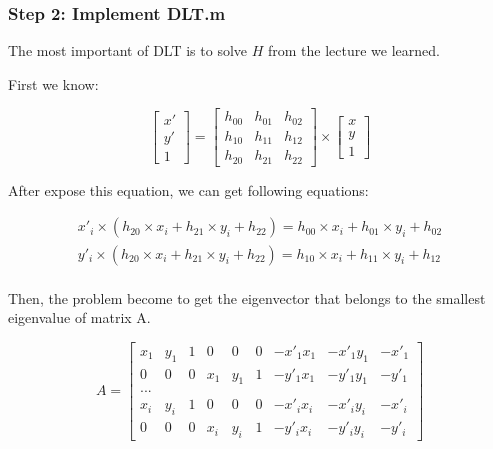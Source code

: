 \documentclass{article}
\begin{document}
\subsubsection*{Step 2: Implement DLT.m}

The most important of DLT is to solve $H$ from the lecture we learned. 

First we know:

$$\begin{bmatrix}
x' \\ y' \\ 1 \end{bmatrix} = \left[ \begin{array}{ccc} h_{00} & h_{01} & h_{02} \\ h_{10} & h_{11} & h_{12} \\ h_{20} & h_{21} & h_{22} \end{array} \right] \times \left[ \begin{array}{c} x \\ y \\ 1 \end{array} \right]$$


After expose this equation, we can get following equations: 

\begin{equation*}
  \begin{aligned}
 		x'_{i}\times(h_{20}\times x_{i} + h_{21}\times y_{i} + h_{22}) = h_{00}\times x_{i} + h_{01}\times y_{i} + h_{02}\\
 		y'_{i}\times(h_{20}\times x_{i} + h_{21}\times y_{i} + h_{22}) = h_{10}\times x_{i} + h_{11}\times y_{i} + h_{12}\\
  \end{aligned}
  \label{eq1}
\end{equation*}

Then, the problem become to get the eigenvector that belongs to the smallest eigenvalue of matrix A.

$$A = \begin{bmatrix} x_{1} & y_{1} & 1 & 0 & 0 & 0 & -x'_{1}x_{1} & -x'_{1} y_{1} & -x'_{1} \\ 0 & 0 & 0 & x_{1} & y_{1} & 1 &  -y'_{1} x_{1} & -y'_{1} y_{1} & -y'_{1} \\ ...  \\ x_{i} & y_{i} & 1 & 0 & 0 & 0 & -x'_{i}x_{i} & -x'_{i} y_{i} & -x'_{i} \\ 0 & 0 & 0 & x_{i} & y_{i} & 1 &  -y'_{i} x_{i} & -y'_{i} y_{i} & -y'_{i} \end{bmatrix} $$
\end{document}
